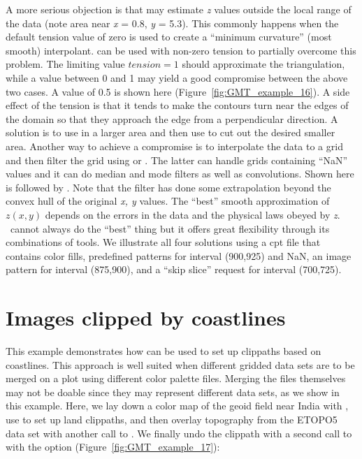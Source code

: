A more serious objection is that  may estimate
{\it z} values outside the local range of the data (note area
near {\it x} = 0.8, {\it y} = 5.3).  This commonly happens when
the default tension value of zero is used to create a ``minimum
curvature'' (most smooth) interpolant.   can be
used with non-zero tension to partially  overcome this problem.
The limiting value $tension = 1$ should approximate the triangulation,
while a value between 0 and 1 may yield a good compromise between
the above two cases.  A value of 0.5 is shown here
(Figure~\ref{fig:GMT_example_16}).  A side
effect of the tension is that it tends to make the contours turn
near the edges of the domain so that they approach the edge from
a perpendicular direction.  A solution is to use 
in a larger area and then use  to cut out the desired
smaller area.  Another way to achieve a compromise is to
interpolate the data to a grid and then filter the grid using
 or .  The latter can handle grids
containing ``NaN'' values and it can do  median and mode filters
as well as convolutions.  Shown here is  followed
by .  Note that the filter has done some
extrapolation beyond the convex hull of the original {\it x, y}
values.  The ``best'' smooth approximation of $z(x, y)$ depends
on the errors in the data and the physical laws obeyed by {\it z}.
\GMT\ cannot always do the ``best'' thing but it offers great
flexibility through its combinations of tools.  We illustrate all
four solutions using a cpt file that contains color fills,
predefined patterns for interval (900,925) and NaN, an image pattern for interval (875,900),
and a ``skip slice'' request for interval (700,725).



\section{Images clipped by coastlines}

This example demonstrates how  can be used
to set up clippaths based on coastlines.  This approach
is well suited when different gridded data sets are to be
merged on a plot using different color palette files.
Merging the files themselves may not be doable since they
may represent different data sets, as we show in this example.
Here, we lay down a color map of the geoid field near India
with , use  to set up land
clippaths, and then overlay topography from the ETOPO5 data
set with another call to .  We finally undo
the clippath with a second call to  with the
option  (Figure~\ref{fig:GMT_example_17}): 

